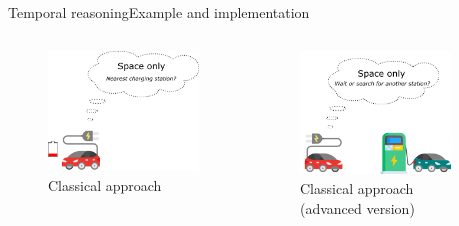 \begin{frame}{Temporal reasoning}{Example and implementation}
\begin{columns}
\begin{column}{.33\linewidth}
\begin{figure}
    \includegraphics[width=.85\linewidth]{figures/one.png}
   \caption{Classical approach}
\end{figure}
\end{column}
\begin{column}{.33\linewidth}
\vspace{.3cm}
\begin{figure}
    \includegraphics[width=.85\linewidth]{figures/two.png}
    \caption{Classical approach (advanced version)}
\end{figure}
\end{column}
\begin{column}{.33\linewidth}

\end{column}
\end{columns}
\end{frame}
